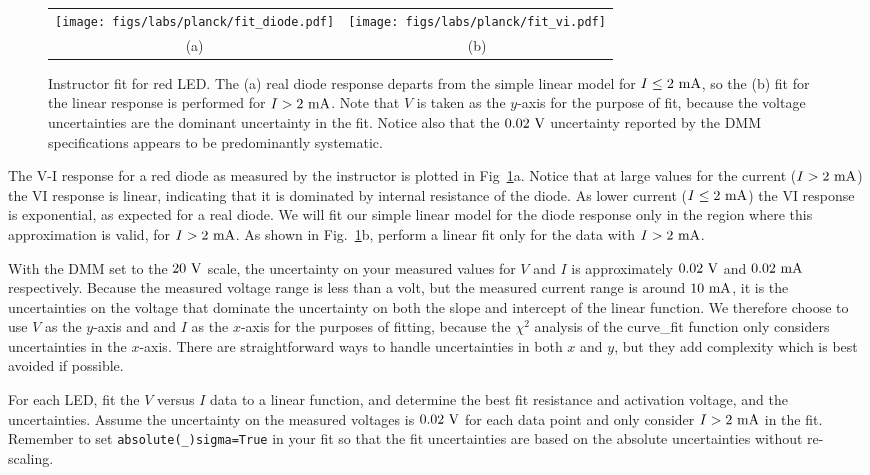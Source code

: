 \begin{figure}[htbp]
\begin{center}
\begin{tabular}{cc}
\texttt{[image: figs/labs/planck/fit\_diode.pdf]} &
\texttt{[image: figs/labs/planck/fit\_vi.pdf]} \\
(a) & (b) \\
\end{tabular}
\end{center}
\caption{Instructor fit for red LED.  The (a) real diode response
  departs from the simple linear model for $I \leq 2~\rm mA$, so the
  (b) fit for the linear response is performed for $I > 2~\rm mA$.
  Note that $V$ is taken as the $y$-axis for the purpose of fit,
  because the voltage uncertainties are the dominant uncertainty in
  the fit.  Notice also that the $0.02~\rm V$ uncertainty reported by
  the DMM specifications appears to be predominantly systematic.}
\label{fig:redfit}
\end{figure}

The V-I response for a red diode as measured by the instructor is
plotted in Fig~\ref{fig:redfit}a.  Notice that at large values for the
current ($I > 2~\rm mA$) the VI response is linear, indicating that it
is dominated by internal resistance of the diode.  As lower current
($I \leq 2~\rm mA$) the VI response is exponential, as expected for a
real diode.  We will fit our simple linear model for the diode
response only in the region where this approximation is valid, for
$I>2~\rm mA$.  As shown in Fig.~\ref{fig:redfit}b, perform a linear
fit only for the data with $I>2~\rm mA$.

With the DMM set to the $20~\rm V$ scale, the uncertainty on your
measured values for $V$ and $I$ is approximately $0.02~\rm V$ and
$0.02~\rm mA$ respectively.  Because the measured voltage range is
less than a volt, but the measured current range is around $10~\rm
mA$, it is the uncertainties on the voltage that dominate the
uncertainty on both the slope and intercept of the linear function.
We therefore choose to use $V$ as the $y$-axis and and $I$ as the
$x$-axis for the purposes of fitting, because the $\chi^2$ analysis of
the {\rm curve{\_}fit} function only considers uncertainties in the
$x$-axis.  There are straightforward ways to handle uncertainties in
both $x$ and $y$, but they add complexity which is best avoided if
possible.

For each LED, fit the $V$ versus $I$ data to a linear function, and
determine the best fit resistance and activation voltage, and the
uncertainties.  Assume the uncertainty on the measured voltages is
$0.02~\rm V$ for each data point and only consider $I > 2~\rm mA$ in
the fit.  Remember to set {\tt absolute(\_)sigma=True} in your fit so
that the fit uncertainties are based on the absolute uncertainties
without re-scaling.

